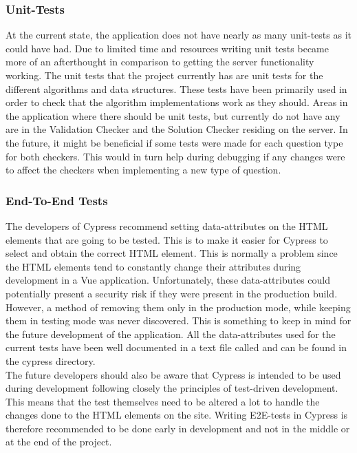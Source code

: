 \subsubsection{Unit-Tests}
At the current state, the application does not have nearly as many unit-tests as it could have had. Due to limited time and resources writing unit tests became more of an afterthought in comparison to getting the server functionality working. The unit tests that the project currently has are unit tests for the different algorithms and data structures. These tests have been primarily used in order to check that the algorithm implementations work as they should. Areas in the application where there should be unit tests, but currently do not have any are in the Validation Checker and the Solution Checker residing on the server. In the future, it might be beneficial if some tests were made for each question type for both checkers. This would in turn help during debugging if any changes were to affect the checkers when implementing a new type of question.
\subsubsection{End-To-End Tests}
The developers of Cypress recommend setting data-attributes on the HTML elements that are going to be tested. This is to make it easier for Cypress to select and obtain the correct HTML element. This is normally a problem since the HTML elements tend to constantly change their attributes during development in a Vue application. Unfortunately, these data-attributes could potentially present a security risk if they were present in the production build. However, a method of removing them only in the production mode, while keeping them in testing mode was never discovered. This is something to keep in mind for the future development of the application. All the data-attributes used for the current tests have been well documented in a text file called  and can be found in the cypress directory.\cite{Cypress:BestPractise}
\\[11pt] 
The future developers should also be aware that Cypress is intended to be used during development following closely the principles of test-driven development. This means that the test themselves need to be altered a lot to handle the changes done to the HTML elements on the site. Writing E2E-tests in Cypress is therefore recommended to be done early in development and not in the middle or at the end of the project.

